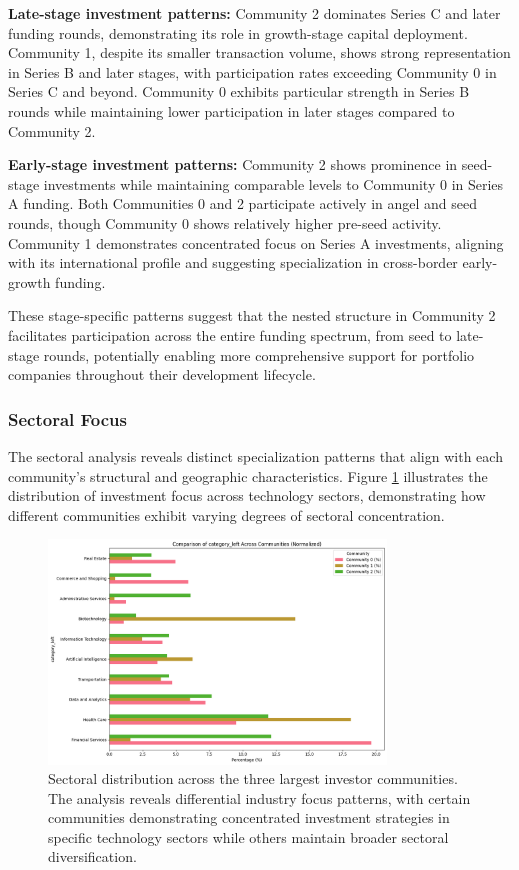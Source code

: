
\textbf{Late-stage investment patterns:} Community 2 dominates Series C and later funding rounds, demonstrating its role in growth-stage capital deployment. Community 1, despite its smaller transaction volume, shows strong representation in Series B and later stages, with participation rates exceeding Community 0 in Series C and beyond. Community 0 exhibits particular strength in Series B rounds while maintaining lower participation in later stages compared to Community 2.

\textbf{Early-stage investment patterns:} Community 2 shows prominence in seed-stage investments while maintaining comparable levels to Community 0 in Series A funding. Both Communities 0 and 2 participate actively in angel and seed rounds, though Community 0 shows relatively higher pre-seed activity. Community 1 demonstrates concentrated focus on Series A investments, aligning with its international profile and suggesting specialization in cross-border early-growth funding.

These stage-specific patterns suggest that the nested structure in Community 2 facilitates participation across the entire funding spectrum, from seed to late-stage rounds, potentially enabling more comprehensive support for portfolio companies throughout their development lifecycle.

\subsubsection{Sectoral Focus}

The sectoral analysis reveals distinct specialization patterns that align with each community's structural and geographic characteristics. Figure \ref{fig:sectoral_distribution} illustrates the distribution of investment focus across technology sectors, demonstrating how different communities exhibit varying degrees of sectoral concentration.

\begin{figure}[htbp]
\centering
\includegraphics[width=0.8\textwidth]{./assets/sectorial-distribution.png}
\caption{Sectoral distribution across the three largest investor communities. The analysis reveals differential industry focus patterns, with certain communities demonstrating concentrated investment strategies in specific technology sectors while others maintain broader sectoral diversification.}
\label{fig:sectoral_distribution}
\end{figure}

